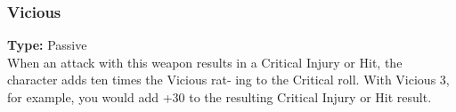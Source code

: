 \subsubsection{Vicious}
\label{iqty:vicious}
\textbf{Type:} Passive\\
When an attack with this weapon results in a Critical
Injury or Hit, the character adds ten times the Vicious rat-
ing to the Critical roll. With Vicious 3, for example, you
would add +30 to the resulting Critical Injury or Hit result.
